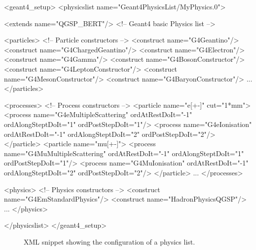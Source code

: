 \documentclass[10pt,a4paper]{article}
\begin{document}
\begin{code}
<geant4_setup>
  <physicslist name="Geant4PhysicsList/MyPhysics.0">

    <extends name="QGSP_BERT"/>                    <!-- Geant4 basic Physics list -->

    <particles>                                    <!-- Particle constructors     -->
      <construct name="G4Geantino"/>
      <construct name="G4ChargedGeantino"/>
      <construct name="G4Electron"/>
      <construct name="G4Gamma"/>
      <construct name="G4BosonConstructor"/>
      <construct name="G4LeptonConstructor"/>
      <construct name="G4MesonConstructor"/>
      <construct name="G4BaryonConstructor"/>
      ...
    </particles>

    <processes>                                    <!-- Process constructors      -->
      <particle name="e[+-]" cut="1*mm">
        <process name="G4eMultipleScattering"  ordAtRestDoIt="-1"       ordAlongSteptDoIt="1"
                                               ordPostStepDoIt="1"/>
        <process name="G4eIonisation"          ordAtRestDoIt="-1"       ordAlongSteptDoIt="2"
                                               ordPostStepDoIt="2"/>
      </particle>
      <particle name="mu[+-]">
        <process name="G4MuMultipleScattering" ordAtRestDoIt="-1"       ordAlongSteptDoIt="1"     
                                               ordPostStepDoIt="1"/>
        <process name="G4MuIonisation"         ordAtRestDoIt="-1"       ordAlongSteptDoIt="2"
                                               ordPostStepDoIt="2"/>
      </particle>
      ...
    </processes>

    <physics>                                      <!-- Physics constructors      -->
      <construct name="G4EmStandardPhysics"/>
      <construct name="HadronPhysicsQGSP"/>
      ...
    </physics>
    
  </physicslist>
</geant4_setup>
\end{code}
\begin{figure}[h]
\caption{XML snippet showing the configuration of a physics list.}
\label{fig:ddg4-setup-xml-physicslist}
\end{figure}
\end{document}
